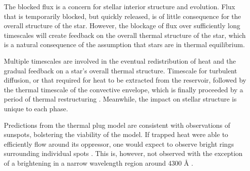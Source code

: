 The blocked flux is a concern for stellar interior structure and evolution. Flux that is temporarily blocked, but quickly released, is of little consequence for the overall structure of the star. However, the blockage of flux over sufficiently long timescales will create feedback on the overall thermal structure of the star, which is a natural consequence of the assumption that stars are in thermal equilibrium. 

Multiple timescales are involved in the eventual redistribution of heat and the gradual feedback on a star's overall thermal structure. Timescale for turbulent diffusion, or that required for heat to be extracted from the reservoir, followed by the thermal timescale of the convective envelope, which is finally proceeded by a period of thermal restructuring \citep{Spruit1982a}. Meanwhile, the impact on stellar structure is unique to each phase.

Predictions from the thermal plug model are consistent with observations of sunspots, bolstering the viability of the model. If trapped heat were able to efficiently flow around its oppressor, one would expect to observe bright rings surrounding individual spots \citep{Spruit1982b}. This is, however, not observed with the exception of a brightening in a narrow wavelength region around 4300 Å \citep{Bray1964}. 
